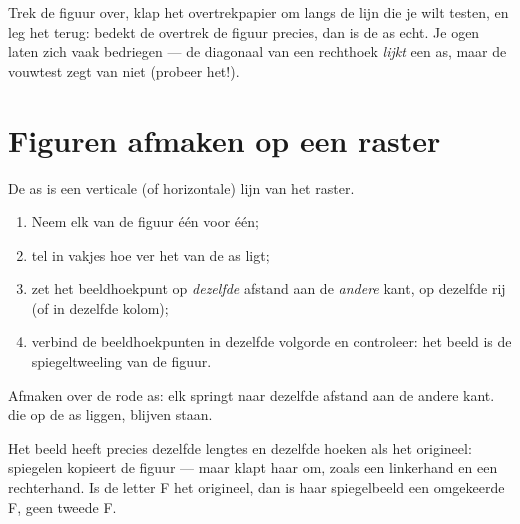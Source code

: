 \begin{example}\label{ex:g4:symmetry:trace}
Trek de figuur over, klap het overtrekpapier om langs de lijn die je wilt
testen, en leg het terug: bedekt de overtrek de figuur precies, dan is de as
echt. Je ogen laten zich vaak bedriegen --- de diagonaal van een rechthoek
\emph{lijkt} een as, maar de vouwtest zegt van niet (probeer het!).
\end{example}

\section{Figuren afmaken op een raster}

\begin{method}\label{met:g4:symmetry:grid}
De as is een verticale (of horizontale) lijn van het raster.
\begin{enumerate}
  \item Neem elk  van de figuur één voor één;
  \item tel in vakjes hoe ver het van de as ligt;
  \item zet het beeldhoekpunt op \emph{dezelfde} afstand aan de
        \emph{andere} kant, op dezelfde rij (of in dezelfde kolom);
  \item verbind de beeldhoekpunten in dezelfde volgorde en controleer: het
        beeld is de spiegeltweeling van de figuur.
\end{enumerate}
\end{method}

\begin{omfigure}

{\small Afmaken over de rode as: elk  springt naar dezelfde afstand
aan de andere kant.  die op de as liggen, blijven staan.}
\end{omfigure}

\begin{example}\label{ex:g4:symmetry:properties}
Het beeld heeft precies dezelfde lengtes en dezelfde hoeken als het
origineel: spiegelen kopieert de figuur --- maar klapt haar om, zoals een
linkerhand en een rechterhand. Is de letter F het origineel, dan is haar
spiegelbeeld een omgekeerde F, geen tweede F.
\end{example}

